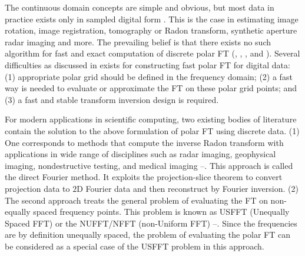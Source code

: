 \documentclass{UCF_ETD}
\begin{document}
 The continuous domain concepts are simple and obvious, but most data in practice exists only in sampled digital form \cite{Lawton1988}. This is the case in estimating image rotation, image registration, tomography or Radon transform, synthetic aperture radar imaging and more. The prevailing belief is that there exists no such algorithm for fast  and exact computation of discrete polar FT (\cite{Briggs1995}, \cite{Amir2006}, \cite{Markus2007}, \cite{Amir2008} and \cite{Amir_II_2008}). Several difficulties as discussed in \cite{Amir2006} exists for constructing fast polar FT for digital data: (1) appropriate polar grid should be defined in the frequency domain; (2) a fast way is needed to evaluate or approximate the FT on these polar grid points; and (3) a fast and stable transform inversion design is required.
 
 For modern applications in scientific computing, two existing bodies of literature contain the solution to the above formulation of polar FT using discrete data. (1) One corresponds to methods that compute the inverse Radon transform with applications in wide range of disciplines such as radar imaging, geophysical imaging, nondestructive testing, and medical imaging \cite{Natterer1986}--\cite{Miao2005}. This approach is called the direct Fourier method. It exploits the projection-slice theorem to convert projection data to $2$D Fourier data and then reconstruct by Fourier inversion. (2) The second approach treats the general problem of evaluating the FT on non-equally spaced frequency points. This problem is known as USFFT (Unequally Spaced FFT) or the NUFFT/NFFT (non-Uniform FFT) \cite{Beylkin1995}--\cite{AlamSP2016}. Since the frequencies are by definition unequally spaced, the problem of evaluating the polar FT can be considered as a special case of the USFFT problem in this approach.
 
\end{document}

